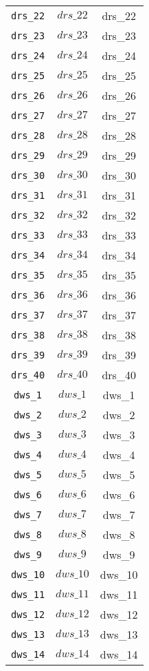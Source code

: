 \begin{center}
\begin{longtable}{ccc}
\texttt{drs\_22} & $drs\_22$ & drs\_22\\
\texttt{drs\_23} & $drs\_23$ & drs\_23\\
\texttt{drs\_24} & $drs\_24$ & drs\_24\\
\texttt{drs\_25} & $drs\_25$ & drs\_25\\
\texttt{drs\_26} & $drs\_26$ & drs\_26\\
\texttt{drs\_27} & $drs\_27$ & drs\_27\\
\texttt{drs\_28} & $drs\_28$ & drs\_28\\
\texttt{drs\_29} & $drs\_29$ & drs\_29\\
\texttt{drs\_30} & $drs\_30$ & drs\_30\\
\texttt{drs\_31} & $drs\_31$ & drs\_31\\
\texttt{drs\_32} & $drs\_32$ & drs\_32\\
\texttt{drs\_33} & $drs\_33$ & drs\_33\\
\texttt{drs\_34} & $drs\_34$ & drs\_34\\
\texttt{drs\_35} & $drs\_35$ & drs\_35\\
\texttt{drs\_36} & $drs\_36$ & drs\_36\\
\texttt{drs\_37} & $drs\_37$ & drs\_37\\
\texttt{drs\_38} & $drs\_38$ & drs\_38\\
\texttt{drs\_39} & $drs\_39$ & drs\_39\\
\texttt{drs\_40} & $drs\_40$ & drs\_40\\
\texttt{dws\_1} & $dws\_1$ & dws\_1\\
\texttt{dws\_2} & $dws\_2$ & dws\_2\\
\texttt{dws\_3} & $dws\_3$ & dws\_3\\
\texttt{dws\_4} & $dws\_4$ & dws\_4\\
\texttt{dws\_5} & $dws\_5$ & dws\_5\\
\texttt{dws\_6} & $dws\_6$ & dws\_6\\
\texttt{dws\_7} & $dws\_7$ & dws\_7\\
\texttt{dws\_8} & $dws\_8$ & dws\_8\\
\texttt{dws\_9} & $dws\_9$ & dws\_9\\
\texttt{dws\_10} & $dws\_10$ & dws\_10\\
\texttt{dws\_11} & $dws\_11$ & dws\_11\\
\texttt{dws\_12} & $dws\_12$ & dws\_12\\
\texttt{dws\_13} & $dws\_13$ & dws\_13\\
\texttt{dws\_14} & $dws\_14$ & dws\_14\\

\end{longtable}
\end{center}
